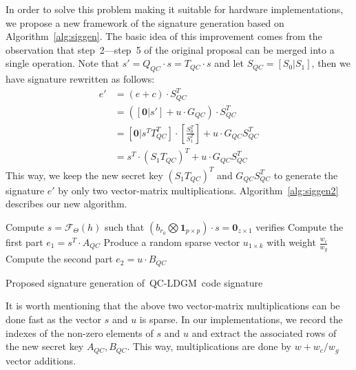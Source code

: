 \documentclass[10pt,journal,compsoc]{IEEEtran}
\begin{document}
In order to solve this problem making it suitable for hardware implementations, we propose a new framework of the signature generation based on Algorithm~\ref{alg:siggen}. The basic idea of this improvement comes from the observation that step~2---step~5 of the original proposal can be merged into a single operation. Note that $s'=Q_{QC}\cdot s = T_{QC}\cdot s$ and let $S_{QC} = [S_0|S_1]$, then we have signature rewritten as follows:
\begin{equation}
\begin{split}
e'&=(e+c)\cdot S_{QC}^T \\
 &= ([\textbf{0} | s'] +u\cdot G_{QC})\cdot S_{QC}^T\\
 &= [\textbf{0}|s^T T_{QC}^T]\cdot[\frac{S_0^T}{S_1^T}] + u\cdot G_{QC}S_{QC}^T\\
 &=s^T\cdot (S_1T_{QC})^T +  u\cdot G_{QC}S_{QC}^T
\end{split}
\end{equation}
This way, we keep the new secret key $(S_1T_{QC})^T$ and $G_{QC}S_{QC}^T$ to generate the signature $e'$ by only two vector-matrix
multiplications. Algorithm~\ref{alg:siggen2} describes our new algorithm.

\begin{algorithm}[h]	
	\DontPrintSemicolon %
    Compute $s=\mathcal{F}_\Theta(h)$ such that $(b_{r_0}\bigotimes \textbf{1}_{p\times p})\cdot s = \textbf{0}_{z\times 1}$ verifies\;
    Compute the first part $e_1 = s^T\cdot A_{QC}$\;
    Produce a random sparse vector $u_{1\times k}$ with weight $\frac{w_c}{w_g}$\;
    Compute the second part $e_2 = u\cdot B_{QC}$\;
	\caption{Proposed signature generation of~QC-LDGM~code signature}\label{alg:siggen2}
\end{algorithm}

It is worth mentioning that the above two vector-matrix multiplications can be done fast as the vector $s$ and $u$ is sparse.
In our implementations, we record the indexes of the non-zero elements of $s$ and $u$ and extract the associated rows of the new secret key $A_{QC},B_{QC}$. This way, multiplications are done by $w+w_c/w_g$ vector additions.
\end{document}
